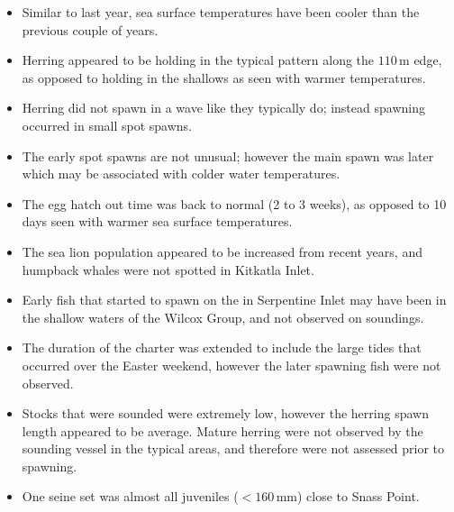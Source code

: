 \begin{itemize}
\item Similar to last year, sea surface temperatures have been cooler than the previous couple of years.
\item Herring appeared to be holding in the typical pattern along the $110\,\text{m}$ edge, as opposed to holding in the shallows as seen with warmer temperatures.
\item Herring did not spawn in a wave like they typically do; instead spawning occurred in small spot spawns.
\item The early spot spawns are not unusual; however the main spawn was later which may be associated with colder water temperatures.
\item The egg hatch out time was back to normal (2 to 3 weeks), as opposed to 10 days seen with warmer sea surface temperatures.
\item The sea lion population appeared to be increased from recent years, and humpback whales were not spotted in Kitkatla Inlet.
\item Early fish that started to spawn on the  in Serpentine Inlet may have been in the shallow waters of the Wilcox Group, and not observed on soundings.
\item The duration of the charter was extended to include the large tides that occurred over the Easter weekend, however the later spawning fish were not observed.
\item Stocks that were sounded were extremely low, however the herring spawn length appeared to be average.
Mature herring were not observed by the sounding vessel in the typical areas, and therefore were not assessed prior to spawning.
\item One seine set was almost all juveniles ($<160\,\text{mm}$) close to Snass Point.
\end{itemize}